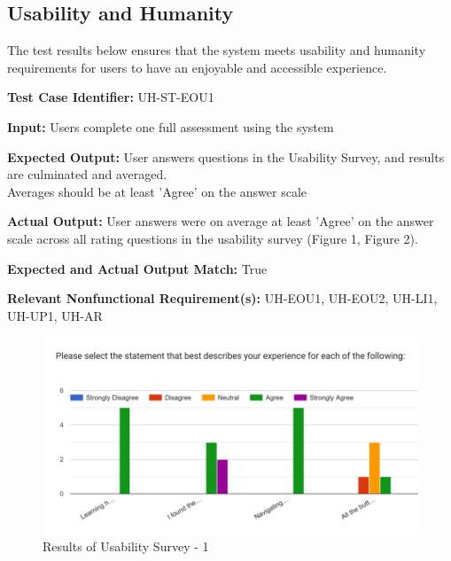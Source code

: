 \documentclass[12pt, titlepage]{article}
\begin{document}
\newpage{}

\subsection{Usability and Humanity}
\hspace{2em}The test results below ensures that the system meets usability and humanity
requirements for users to have an enjoyable and accessible experience.

\begin{mdframed}[linewidth=0.5mm] \par
  \textbf{Test Case Identifier:} UH-ST-EOU1 \par
  \textbf{Input:} Users complete one full assessment using the system \par
  \textbf{Expected Output:} User answers questions in the Usability Survey, and results are culminated and averaged.\\
  Averages should be at least 'Agree' on the answer scale \par
  \textbf{Actual Output:} User answers were on average at least 'Agree' on the answer scale across all rating questions in the usability survey (Figure 1, Figure 2).\par
  \textbf{Expected and Actual Output Match:} True \par
  \textbf{Relevant Nonfunctional Requirement(s):} UH-EOU1, UH-EOU2, UH-LI1, UH-UP1, UH-AR
\end{mdframed}

\begin{figure}[h]
  \centering
  \includegraphics[width=1\textwidth]{images/UsabilityTestResults_pt1.png}
  \caption{Results of Usability Survey - 1}
\end{figure}
\end{document}
